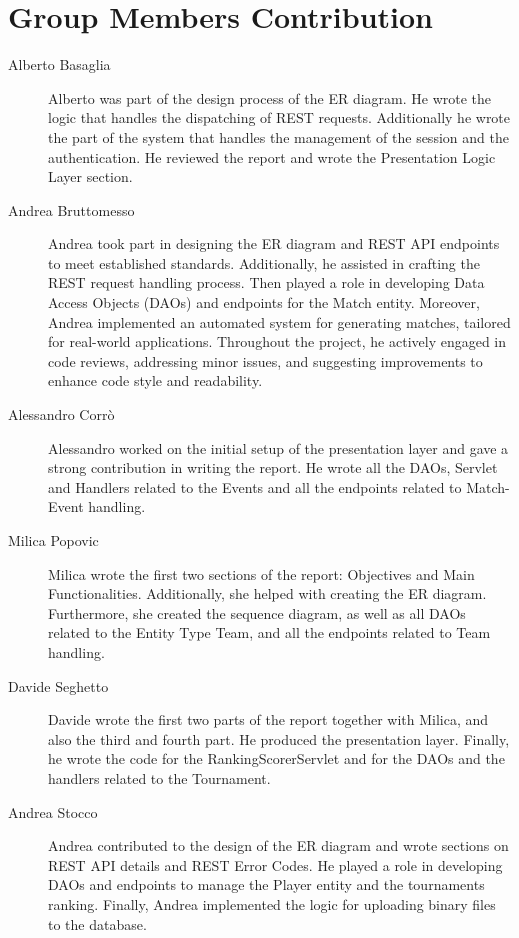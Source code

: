 \section{Group Members Contribution}

\begin{description}
	\item[Alberto Basaglia]
Alberto was part of the design process of the ER diagram.
He wrote the logic that handles the dispatching of REST requests.
Additionally he wrote the part of the system that handles the management of the session and the authentication.
He reviewed the report and wrote the Presentation Logic Layer section.
	\item[Andrea Bruttomesso]
Andrea took part in designing the ER diagram and REST API endpoints to meet established standards.
Additionally, he assisted in crafting the REST request handling process.
Then played a role in developing Data Access Objects (DAOs) and endpoints for the Match entity. Moreover, Andrea implemented an automated system for generating matches, tailored for real-world applications.
Throughout the project, he actively engaged in code reviews, addressing minor issues, and suggesting improvements to enhance code style and readability.
	\item[Alessandro Corrò]
Alessandro worked on the initial setup of the presentation layer and gave a strong contribution in writing the report.
He wrote all the DAOs, Servlet and Handlers related to the Events and all the endpoints related to Match-Event handling.
	\item[Milica Popovic]
Milica wrote the first two sections of the report: Objectives and Main Functionalities.
Additionally, she helped with creating the ER diagram.
Furthermore, she created the sequence diagram, as well as all DAOs related to the Entity Type Team, and all the endpoints related to Team handling.
	\item[Davide Seghetto]
Davide wrote the first two parts of the report together with Milica, and also the third and fourth part.
He produced the presentation layer. Finally, he wrote the code for the RankingScorerServlet and for the DAOs
and the handlers related to the Tournament.
	\item[Andrea Stocco]
Andrea contributed to the design of the ER diagram and wrote sections on REST API details and REST Error Codes.
He played a role in developing DAOs and endpoints to manage the Player entity and the tournaments ranking.
Finally, Andrea implemented the logic for uploading binary files to the database.
\end{description}
